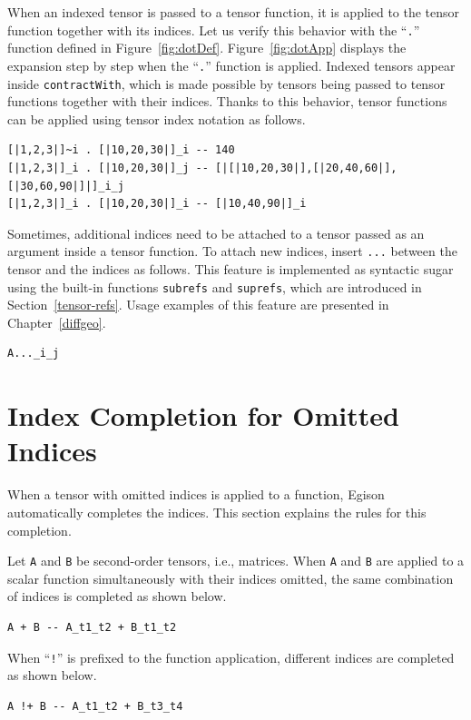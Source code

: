 When an indexed tensor is passed to a tensor function, it is applied to the tensor function together with its indices.
Let us verify this behavior with the ``\lstinline{.}'' function defined in Figure~\ref{fig:dotDef}.
Figure~\ref{fig:dotApp} displays the expansion step by step when the ``\lstinline{.}'' function is applied.
Indexed tensors appear inside \lstinline{contractWith}, which is made possible by tensors being passed to tensor functions together with their indices.
Thanks to this behavior, tensor functions can be applied using tensor index notation as follows.
\begin{lstlisting}[language=egison,numbers=none]
[|1,2,3|]~i . [|10,20,30|]_i -- 140
[|1,2,3|]_i . [|10,20,30|]_j -- [|[|10,20,30|],[|20,40,60|],[|30,60,90|]|]_i_j
[|1,2,3|]_i . [|10,20,30|]_i -- [|10,40,90|]_i
\end{lstlisting}

Sometimes, additional indices need to be attached to a tensor passed as an argument inside a tensor function.
To attach new indices, insert \lstinline{...} between the tensor and the indices as follows.
This feature is implemented as syntactic sugar using the built-in functions \lstinline{subrefs} and \lstinline{suprefs}, which are introduced in Section~\ref{tensor-refs}.
Usage examples of this feature are presented in Chapter~\ref{diffgeo}.
\begin{lstlisting}[language=egison,numbers=none]
A..._i_j
\end{lstlisting}

\section{Index Completion for Omitted Indices}\label{tensor-completion}

When a tensor with omitted indices is applied to a function, Egison automatically completes the indices.
This section explains the rules for this completion.

Let \lstinline{A} and \lstinline{B} be second-order tensors, i.e., matrices.
When \lstinline{A} and \lstinline{B} are applied to a scalar function simultaneously with their indices omitted, the same combination of indices is completed as shown below.
\begin{lstlisting}[language=egison,numbers=none]
A + B -- A_t1_t2 + B_t1_t2
\end{lstlisting}
When ``\lstinline|!|'' is prefixed to the function application, different indices are completed as shown below.
\begin{lstlisting}[language=egison,numbers=none]
A !+ B -- A_t1_t2 + B_t3_t4
\end{lstlisting}

